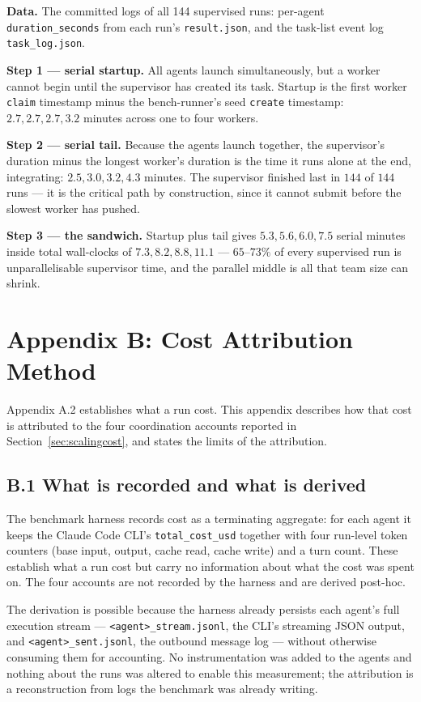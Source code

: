 \documentclass[11pt,a4paper]{article}
\begin{document}
\textbf{Data.} The committed logs of all 144 supervised runs: per-agent \texttt{duration\_seconds} from each run's \texttt{result.json}, and the task-list event log \texttt{task\_log.json}.

\textbf{Step 1 --- serial startup.} All agents launch simultaneously, but a worker cannot begin until the supervisor has created its task. Startup is the first worker \texttt{claim} timestamp minus the bench-runner's seed \texttt{create} timestamp: $2.7, 2.7, 2.7, 3.2$ minutes across one to four workers.

\textbf{Step 2 --- serial tail.} Because the agents launch together, the supervisor's duration minus the longest worker's duration is the time it runs alone at the end, integrating: $2.5, 3.0, 3.2, 4.3$ minutes. The supervisor finished last in $144$ of $144$ runs --- it is the critical path by construction, since it cannot submit before the slowest worker has pushed.

\textbf{Step 3 --- the sandwich.} Startup plus tail gives $5.3, 5.6, 6.0, 7.5$ serial minutes inside total wall-clocks of $7.3, 8.2, 8.8, 11.1$ --- $65$--$73\%$ of every supervised run is unparallelisable supervisor time, and the parallel middle is all that team size can shrink.


\section*{Appendix B: Cost Attribution Method}

Appendix A.2 establishes what a run cost. This appendix describes how that cost is
attributed to the four coordination accounts reported in Section~\ref{sec:scalingcost},
and states the limits of the attribution.

\subsection*{B.1 \quad What is recorded and what is derived}

The benchmark harness records cost as a terminating aggregate: for each agent it
keeps the Claude Code CLI's \texttt{total\_cost\_usd} together with four run-level
token counters (base input, output, cache read, cache write) and a turn count.
These establish what a run cost but carry no information about what the cost was
spent on. The four accounts are not recorded by the harness and are derived
post-hoc.

The derivation is possible because the harness already persists each agent's full
execution stream --- \texttt{<agent>\_stream.jsonl}, the CLI's streaming JSON
output, and \texttt{<agent>\_sent.jsonl}, the outbound message log --- without
otherwise consuming them for accounting. No instrumentation was added to the
agents and nothing about the runs was altered to enable this measurement; the
attribution is a reconstruction from logs the benchmark was already writing.
\end{document}

